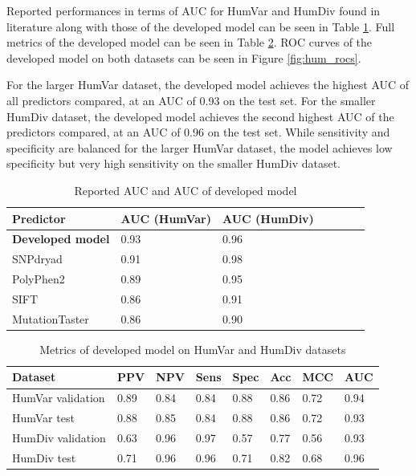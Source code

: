 \documentclass[11pt]{article}
\begin{document}
Reported performances in terms of AUC for HumVar and HumDiv found in literature\cite{wong2014snpdryad} along with those of the developed model can be seen in Table \ref{table:hum_auc}. Full metrics of the developed model can be seen in Table \ref{table:hum_metrics}. ROC curves of the developed model on both datasets can be seen in Figure \ref{fig:hum_rocs}.

For the larger HumVar dataset, the developed model achieves the highest AUC of all predictors compared, at an AUC of 0.93 on the test set.
For the smaller HumDiv dataset, the developed model achieves the second highest AUC of the predictors compared, at an AUC of 0.96 on the test set. While sensitivity and specificity are balanced for the larger HumVar dataset, the model achieves low specificity but very high sensitivity on the smaller HumDiv dataset. 

\begin{table}
\caption{Reported AUC and AUC of developed model}
\label{table:hum_auc}
\begin{center}
\begin{tabular}{lllllll}
\toprule
Predictor & AUC (HumVar) & AUC (HumDiv) \\ 
\midrule
\textbf{Developed model} & 0.93 & 0.96 \\
SNPdryad & 0.91 & 0.98   \\
PolyPhen2 & 0.89 & 0.95  \\
SIFT & 0.86 & 0.91 \\ 
MutationTaster & 0.86 & 0.90  \\ 
\bottomrule
\end{tabular}
\end{center}
\end{table}

\begin{table}
\caption{Metrics of developed model on HumVar and HumDiv datasets}
\label{table:hum_metrics}
\begin{center}
\begin{tabular}{llllllll}
\toprule
Dataset & PPV & NPV & Sens & Spec & Acc & MCC & AUC \\ 
\midrule
HumVar validation & 0.89 & 0.84 & 0.84 & 0.88 & 0.86 & 0.72 & 0.94 \\ 
HumVar test & 0.88 & 0.85 & 0.84 & 0.88 & 0.86 & 0.72 & 0.93  \\ 
HumDiv validation & 0.63 & 0.96 & 0.97 & 0.57 & 0.77 & 0.56 & 0.93  \\
HumDiv test & 0.71 & 0.96 & 0.96 & 0.71 & 0.82 & 0.68 & 0.96  \\ 
\bottomrule
\end{tabular}
\end{center}
\end{table}
\end{document}
